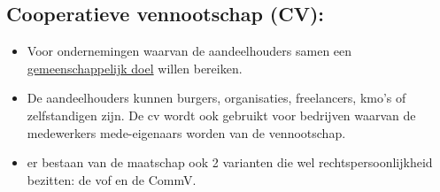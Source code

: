 \documentclass[12pt]{article}
\begin{document}
\subsection{Cooperatieve vennootschap (CV):}
\begin{itemize}
    \item Voor ondernemingen waarvan de aandeelhouders samen een \underline{gemeenschappelijk doel} willen bereiken.
    \item De aandeelhouders kunnen burgers, organisaties, freelancers, kmo's of zelfstandigen zijn. De cv wordt ook gebruikt voor bedrijven waarvan de medewerkers mede-eigenaars worden van de vennootschap.
    \item er bestaan van de maatschap ook 2 varianten die wel rechtspersoonlijkheid bezitten: de vof en de CommV.
\end{itemize}
\end{document}
